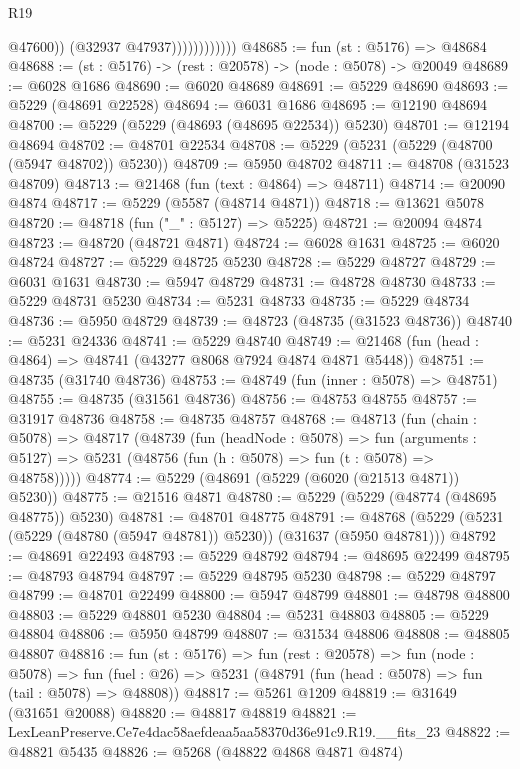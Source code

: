 \begin{lexlean}{R19}
\begin{coremodule}
                              @47600))
                          (@32937 @47937))))))))))))
@48685 := fun (st : @5176) => @48684
@48688 := (st : @5176) -> (rest : @20578) -> (node : @5078) -> @20049
@48689 := @6028 @1686
@48690 := @6020 @48689
@48691 := @5229 @48690
@48693 := @5229 (@48691 @22528)
@48694 := @6031 @1686
@48695 := @12190 @48694
@48700 := @5229 (@5229 (@48693 (@48695 @22534)) @5230)
@48701 := @12194 @48694
@48702 := @48701 @22534
@48708 := @5229 (@5231 (@5229 (@48700 (@5947 @48702)) @5230))
@48709 := @5950 @48702
@48711 := @48708 (@31523 @48709)
@48713 := @21468 (fun (text : @4864) => @48711)
@48714 := @20090 @4874
@48717 := @5229 (@5587 (@48714 @4871))
@48718 := @13621 @5078
@48720 := @48718 (fun ("_" : @5127) => @5225)
@48721 := @20094 @4874
@48723 := @48720 (@48721 @4871)
@48724 := @6028 @1631
@48725 := @6020 @48724
@48727 := @5229 @48725 @5230
@48728 := @5229 @48727
@48729 := @6031 @1631
@48730 := @5947 @48729
@48731 := @48728 @48730
@48733 := @5229 @48731 @5230
@48734 := @5231 @48733
@48735 := @5229 @48734
@48736 := @5950 @48729
@48739 := @48723 (@48735 (@31523 @48736))
@48740 := @5231 @24336
@48741 := @5229 @48740
@48749 := @21468 (fun (head : @4864) => @48741 (@43277 @8068 @7924 @4874 @4871 @5448))
@48751 := @48735 (@31740 @48736)
@48753 := @48749 (fun (inner : @5078) => @48751)
@48755 := @48735 (@31561 @48736)
@48756 := @48753 @48755
@48757 := @31917 @48736
@48758 := @48735 @48757
@48768 := @48713
    (fun (chain : @5078) =>
    @48717
      (@48739
        (fun (headNode : @5078) =>
        fun (arguments : @5127) => @5231 (@48756 (fun (h : @5078) => fun (t : @5078) => @48758)))))
@48774 := @5229 (@48691 (@5229 (@6020 (@21513 @4871)) @5230))
@48775 := @21516 @4871
@48780 := @5229 (@5229 (@48774 (@48695 @48775)) @5230)
@48781 := @48701 @48775
@48791 := @48768 (@5229 (@5231 (@5229 (@48780 (@5947 @48781)) @5230)) (@31637 (@5950 @48781)))
@48792 := @48691 @22493
@48793 := @5229 @48792
@48794 := @48695 @22499
@48795 := @48793 @48794
@48797 := @5229 @48795 @5230
@48798 := @5229 @48797
@48799 := @48701 @22499
@48800 := @5947 @48799
@48801 := @48798 @48800
@48803 := @5229 @48801 @5230
@48804 := @5231 @48803
@48805 := @5229 @48804
@48806 := @5950 @48799
@48807 := @31534 @48806
@48808 := @48805 @48807
@48816 := fun (st : @5176) =>
  fun (rest : @20578) =>
  fun (node : @5078) =>
  fun (fuel : @26) => @5231 (@48791 (fun (head : @5078) => fun (tail : @5078) => @48808))
@48817 := @5261 @1209
@48819 := @31649 (@31651 @20088)
@48820 := @48817 @48819
@48821 := LexLeanPreserve.Ce7e4dac58aefdeaa5aa58370d36e91c9.R19.__fits_23
@48822 := @48821 @5435
@48826 := @5268 (@48822 @4868 @4871 @4874)

\end{coremodule}
\end{lexlean}

